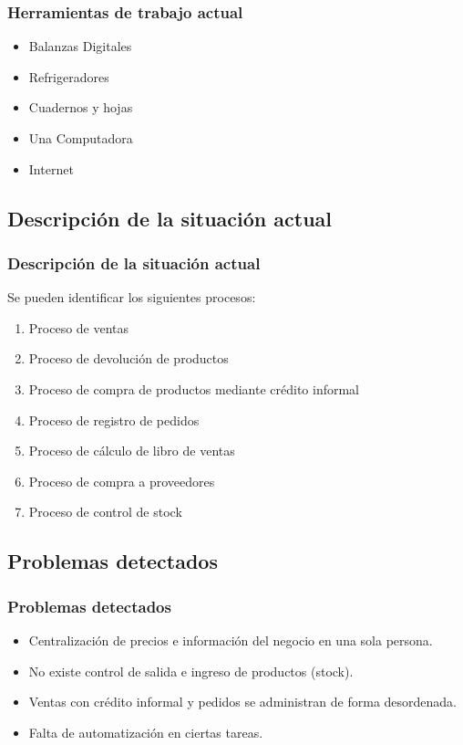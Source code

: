 \documentclass{beamer}
\begin{document}
\begin{frame}
\frametitle{Herramientas de trabajo actual}
\begin{itemize}
\item Balanzas Digitales
\item Refrigeradores
\item Cuadernos y hojas
\item \alert{Una Computadora}
\item \alert{Internet}
\end{itemize}
\end{frame}

\subsection{Descripción de la situación actual}

\begin{frame}
\frametitle{Descripción de la situación actual}
Se pueden identificar los siguientes procesos:
\begin{enumerate}
\item Proceso de ventas                       
\item Proceso de devolución de productos 
\item Proceso de compra de productos mediante crédito informal 
\item Proceso de registro de pedidos 
\item Proceso de cálculo de libro de ventas 
\item Proceso de compra a proveedores 
\item Proceso de control de stock
\end{enumerate}
\end{frame}

\subsection{Problemas detectados}

\begin{frame}
\frametitle{Problemas detectados}
\begin{itemize}
\item Centralización de precios e información del negocio en una sola persona. 
\item No existe control de salida e ingreso de productos (stock). 
\item Ventas con crédito informal y pedidos se administran de forma desordenada. 
\item Falta de automatización en ciertas tareas.
\end{itemize}
\end{frame}
\end{document}
